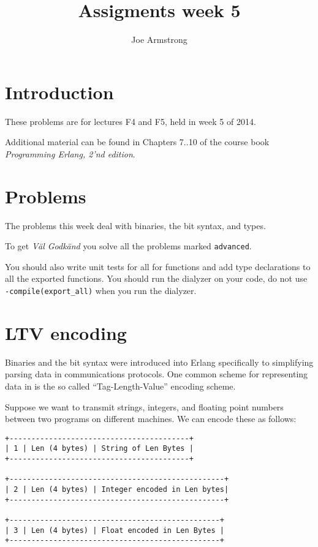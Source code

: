 ﻿\documentclass[12pt]{hitec}
\title{Assigments week 5}
\author{Joe Armstrong}
\begin{document}
\maketitle

\tableofcontents

\section{Introduction}
These problems are for lectures F4 and F5, held in week 5 of 2014.

Additional material can be found in Chapters 7..10 of the course book
{\sl Programming Erlang, 2'nd edition}.

\section{Problems}

The problems this week deal with binaries, the bit syntax, and types.

To get {\sl V\"{a}l Godk\"{a}nd} you solve all the problems marked
\verb+advanced+.

You should also write unit tests for all for functions and add type
declarations to all the exported functions. You should run the dialyzer
on your code, do not use \verb+-compile(export_all)+ when you run the dialyzer.

\section{LTV encoding}

Binaries and the bit syntax were introduced into Erlang specifically to
simplifying parsing data in communications protocols. 
One common scheme for representing data in
is the so called ``Tag-Length-Value'' encoding scheme.

Suppose we want to transmit strings, integers, and floating point numbers
between two programs on different machines. We can encode these as follows:

\begin{verbatim}
+-----------------------------------------+
| 1 | Len (4 bytes) | String of Len Bytes |
+-----------------------------------------+

+-------------------------------------------------+
| 2 | Len (4 bytes) | Integer encoded in Len bytes|
+-------------------------------------------------+

+------------------------------------------------+
| 3 | Len (4 bytes) | Float encoded in Len Bytes |
+------------------------------------------------+
\end{verbatim}
\end{document}
